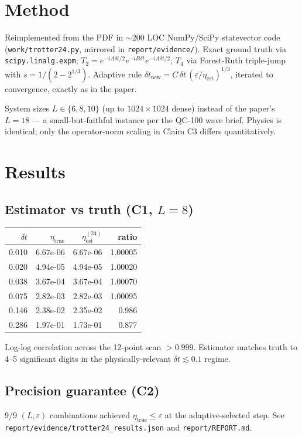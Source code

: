 \documentclass[11pt]{article}
\begin{document}
\section{Method}

Reimplemented from the PDF in $\sim$200 LOC NumPy/SciPy statevector code
(\texttt{work/trotter24.py}, mirrored in \texttt{report/evidence/}). Exact ground truth via
\texttt{scipy.linalg.expm}; $T_2 = e^{-iA\delta t/2}e^{-iB\delta t}e^{-iA\delta t/2}$;
$T_4$ via Forest-Ruth triple-jump with $s = 1/(2-2^{1/3})$. Adaptive rule
$\delta t_{\mathrm{new}} = C\,\delta t\,(\varepsilon/\eta_{\mathrm{est}})^{1/3}$, iterated to
convergence, exactly as in the paper.

System sizes $L\in\{6,8,10\}$ (up to $1024\times1024$ dense) instead of the paper's $L=18$ ---
a small-but-faithful instance per the QC-100 wave brief. Physics is identical; only the
operator-norm scaling in Claim C3 differs quantitatively.

\section{Results}

\subsection*{Estimator vs truth (C1, $L=8$)}
\begin{center}
\begin{tabular}{rrrr}
\toprule
$\delta t$ & $\eta_{\mathrm{true}}$ & $\eta_{\mathrm{est}}^{(24)}$ & ratio \\
\midrule
0.010 & 6.67e-06 & 6.67e-06 & 1.00005 \\
0.020 & 4.94e-05 & 4.94e-05 & 1.00020 \\
0.038 & 3.67e-04 & 3.67e-04 & 1.00070 \\
0.075 & 2.82e-03 & 2.82e-03 & 1.00095 \\
0.146 & 2.38e-02 & 2.35e-02 & 0.986 \\
0.286 & 1.97e-01 & 1.73e-01 & 0.877 \\
\bottomrule
\end{tabular}
\end{center}
Log-log correlation across the 12-point scan $>0.999$. Estimator matches truth to 4--5
significant digits in the physically-relevant $\delta t \lesssim 0.1$ regime.

\subsection*{Precision guarantee (C2)}
9/9 $(L,\varepsilon)$ combinations achieved $\eta_{\mathrm{true}} \le \varepsilon$ at the
adaptive-selected step. See \texttt{report/evidence/trotter24\_results.json} and
\texttt{report/REPORT.md}.
\end{document}
